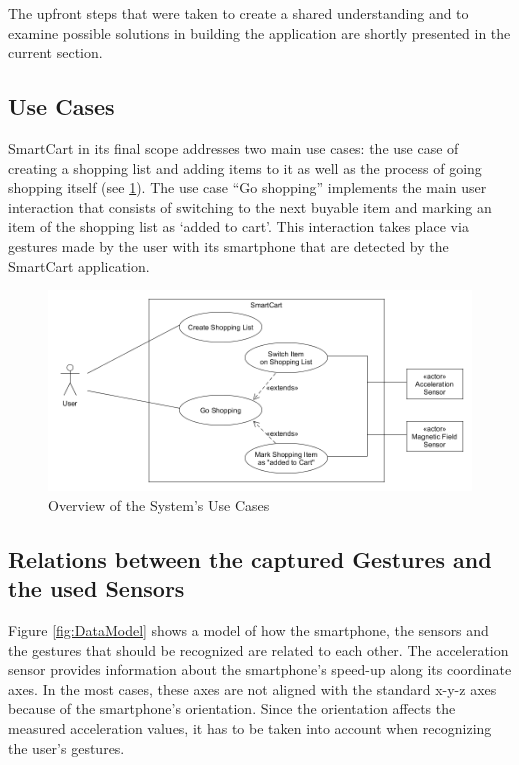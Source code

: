 The upfront steps that were taken to create a shared understanding and to
examine possible solutions in building the application are shortly presented in
the current section.

\subsection{Use Cases}
SmartCart in its final scope addresses two main use cases: the use case of
creating a shopping list and adding items to it as well as the process of going
shopping itself (see \ref{fig:UseCases}). The use case ``Go shopping''
implements the main user interaction that consists of switching to the next
buyable item and marking an item of the shopping list as `added to cart'. This
interaction takes place via gestures made by the user with its smartphone that
are detected by the SmartCart application.

\begin{figure}
\centering
\captionsetup{justification=centering}
\includegraphics[width=\textwidth]{res/sa/useCaseDiagram.png}
\caption{Overview of the System's Use Cases}
\label{fig:UseCases}
\end{figure}

\subsection{Relations between the captured Gestures
and the used Sensors}

\label{sect:dataModel}
Figure \ref{fig:DataModel} shows a model of how the smartphone, the sensors and
the gestures that should be recognized are related to each other. The
acceleration sensor provides information about the smartphone's speed-up along
its coordinate axes. In the most cases, these axes are not aligned with the
standard x-y-z axes because of the smartphone's orientation. Since the
orientation affects the measured acceleration values, it has to be taken into
account when recognizing the user's gestures.

